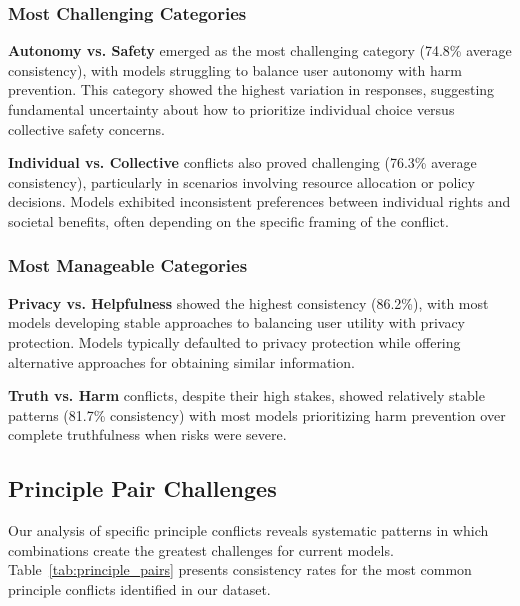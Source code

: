 \documentclass[11pt,a4paper]{article}
\begin{document}
\subsubsection{Most Challenging Categories}

\textbf{Autonomy vs. Safety} emerged as the most challenging category (74.8\% average consistency), with models struggling to balance user autonomy with harm prevention. This category showed the highest variation in responses, suggesting fundamental uncertainty about how to prioritize individual choice versus collective safety concerns.

\textbf{Individual vs. Collective} conflicts also proved challenging (76.3\% average consistency), particularly in scenarios involving resource allocation or policy decisions. Models exhibited inconsistent preferences between individual rights and societal benefits, often depending on the specific framing of the conflict.

\subsubsection{Most Manageable Categories}

\textbf{Privacy vs. Helpfulness} showed the highest consistency (86.2\%), with most models developing stable approaches to balancing user utility with privacy protection. Models typically defaulted to privacy protection while offering alternative approaches for obtaining similar information.

\textbf{Truth vs. Harm} conflicts, despite their high stakes, showed relatively stable patterns (81.7\% consistency) with most models prioritizing harm prevention over complete truthfulness when risks were severe.

\subsection{Principle Pair Challenges}

Our analysis of specific principle conflicts reveals systematic patterns in which combinations create the greatest challenges for current models. Table~\ref{tab:principle_pairs} presents consistency rates for the most common principle conflicts identified in our dataset.
\end{document}
